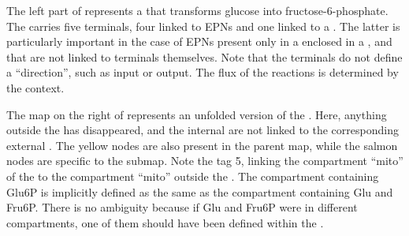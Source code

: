 The left part of  represents a  that transforms glucose into fructose-6-phosphate. The  carries five terminals, four linked to EPNs and one linked to a .  The latter is particularly important in the case of EPNs present only in a  enclosed in a , and that are not linked to terminals themselves.  Note that the terminals do not define a ``direction'', such as input or output.  The flux of the reactions is determined by the context.

The map on the right of  represents an unfolded version of the .  Here, anything outside the  has disappeared, and the internal  are not linked to the corresponding external . The yellow nodes are also present in the parent map, while the salmon nodes are specific to the submap. Note the tag 5, linking the compartment ``mito'' of the  to the compartment ``mito'' outside the .  The compartment containing Glu6P is implicitly defined as the same as the compartment containing Glu and Fru6P.  There is no ambiguity because if Glu and Fru6P were in different compartments, one of them should have been defined within the .

